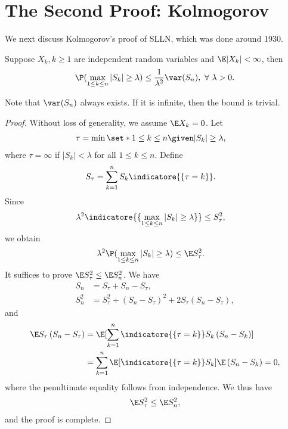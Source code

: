 \documentclass[../aipt.tex]{subfiles}
\begin{document}
\section{The Second Proof: Kolmogorov}

We next discuss Kolmogorov's proof of SLLN, which was done around 1930.

\begin{Theorem} \label{wk7:lemma:Kolmogorov_maximal_ineq}
Suppose $X_k, k \geq 1$ are independent random variables and $\E |X_k| < \infty$, then
\begin{align*}
\P(\max_{1 \leq k \leq n} |S_k| \geq \lambda) 
\leq \frac{1}{\lambda^2} \var(S_n),\ \forall\ \lambda > 0.
\end{align*}
\end{Theorem}
Note that $\var(S_n)$ always exists. If it is infinite, then the bound is trivial.
\begin{proof}
Without loss of generality, we assume $\E X_k = 0$. Let
\begin{align*}
&\tau = \min \set*{1 \leq k \leq n \given |S_k| \geq \lambda},
\end{align*}
where $\tau = \infty$ if $|S_k|<\lambda$ for all $1\leq k\leq n$. Define
\begin{align*}
&S_\tau = \sum_{k=1}^n S_k \indicatore{\{\tau = k\}}.
\end{align*}
Since
\begin{align*}
&\lambda^2 \indicatore{\{\max_{1 \leq k \leq n} |S_k| \geq \lambda\}} \leq S_{\tau}^2,
\end{align*}
we obtain
\begin{align*}
&\lambda^2 \P(\max_{1 \leq k \leq n} |S_k| \geq \lambda) \leq \E S_{\tau}^2.
\end{align*}
It suffices to prove $\E S_{\tau}^2 \leq \E S_n^2$. We have
\begin{align*}
S_n &= S_{\tau} + S_n - S_{\tau}, \\
S_n^2 &= S_{\tau}^2 + \left(S_n - S_{\tau}\right)^2 + 2S_{\tau}\left(S_n - S_{\tau}\right),
\end{align*}
and
\begin{align*}
\E S_{\tau}\left(S_n - S_{\tau}\right)
&= \E[\sum_{k=1}^n \indicatore{\{\tau = k\}} S_k\left(S_n - S_k\right)] \\
&= \sum_{k=1}^n \E[\indicatore{\{\tau = k\}} S_k] \E \left(S_n - S_k\right) = 0,
\end{align*}
where the penultimate equality follows from independence. We thus have
\begin{align*}
\E S_{\tau}^2 \leq \E S_n^2,
\end{align*}
and the proof is complete.
\end{proof}
\end{document}
